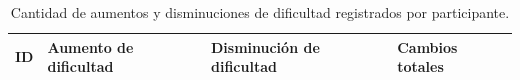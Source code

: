\begin{table}[H]
    \centering
    \caption{Cantidad de aumentos y disminuciones de dificultad registrados por participante.}
    \label{tab:cambiosDificultad}

    \renewcommand{\arraystretch}{1.3}
    \setlength{\tabcolsep}{4pt}

    \begin{tabularx}{\textwidth}{
        |>{\centering\arraybackslash}X
        |>{\centering\arraybackslash}X
        |>{\centering\arraybackslash}X
        |>{\centering\arraybackslash}X|
    }
        \hline

        \textbf{ID} &
        \textbf{Aumento de dificultad} &
        \textbf{Disminución de dificultad} &
        \textbf{Cambios totales} \\ \hline


\end{tabularx}
\end{table}
